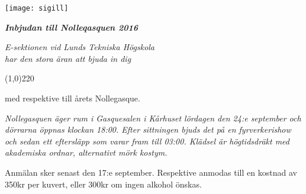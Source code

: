 \documentclass[11pt]{article}
\def\date{2016}
\def\doctitle{Inbjudan till Nolleqasquen \date}
\begin{document}
    \begin{center}
        \texttt{[image: sigill]}
        \par
        \vspace*{6mm}

        \textit{\textbf{\Large \doctitle}}

        {\it
            E-sektionen vid Lunds Tekniska Högskola\\
            har den stora äran att bjuda in dig
            \par \vspace*{8mm} \line(1,0){220} \par \vspace*{-1mm}
            med respektive till årets Nollegasque.
        }
    \end{center}

    \vspace*{\baselineskip}

    {\it
    Nollegasquen äger rum i Gasquesalen i Kårhuset lördagen den 24:e september och dörrarna öppnas klockan 18:00. Efter sittningen bjuds det på en fyrverkerishow och sedan ett eftersläpp som varar fram till 03:00. Klädsel är högtidsdräkt med akademiska ordnar, alternativt mörk kostym.

    Anmälan sker senast den 17:e september. Respektive anmodas till en kostnad av 350kr per kuvert, eller 300kr om ingen alkohol önskas.
    }
\end{document}
